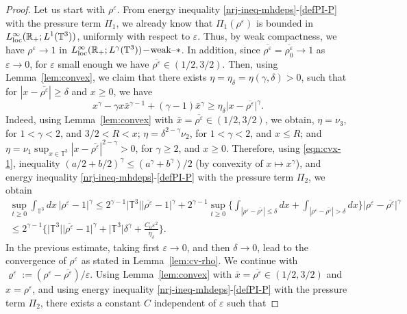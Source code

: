 \documentclass[11pt,reqno]{amsart}
\def \R{{\mathbb{R}}}
\def \T{{\mathbb{T}}}
\begin{document}
\begin{proof}
  Let us start with $\rho^\varepsilon$. From energy inequality \eqref{nrj-ineq-mhdeps}-\eqref{defPI-P} with the pressure term $\Pi_1$, we already know that $\Pi_1(\rho^\varepsilon)$ is  bounded in $ L_{\rm loc}^\infty(\R_+; L^1(\T^3))$, uniformly with respect to $\varepsilon$. Thus, by weak compactness, we have  $\rho^\varepsilon \rightarrow 1$ in $L_{\rm loc}^\infty(\R_+; L^\gamma(\T^3))\!-\!\mbox{\rm weak--}\ast$. In addition, since $\overline{\rho^\varepsilon}=\overline{\rho_0^\varepsilon}\rightarrow 1$ as $\varepsilon\rightarrow 0$, for $\varepsilon$ small enough we have $\overline{\rho^\varepsilon}\in (1/2,3/2)$. Then, using Lemma~\ref{lem:convex}, we claim that there exists $\eta=\eta_\delta=\eta(\gamma,\delta) >0$, such that for $|x-\overline{\rho^\varepsilon}|\geq \delta$ and $x\geq 0$, we have
  \begin{equation}
    \label{eqn:cvx-1}
    x^\gamma  - \gamma x\bar{x}^{\gamma -1} + (\gamma-1)\bar{x}^\gamma \geq \eta_\delta \big |x-\overline{\rho^\varepsilon}\big |^\gamma.   
  \end{equation}
  Indeed, using  Lemma~\ref{lem:convex} with  $\bar x = \overline{\rho^\varepsilon} \in  (1/2,3/2)$, we obtain, $\eta=\nu_3$, for $1<\gamma < 2$, and $3/2<R<x$;  $\eta=\delta^{2-\gamma}\nu_2$,  for $1< \gamma < 2$, and $x\leq R$; and  $\eta=\nu_1\sup_{x\in\T^3}|x-\overline{\rho^\varepsilon}|^{2-\gamma}>0$,  for $\gamma \geq 2$, and $x\geq 0$. Therefore, using \eqref{eqn:cvx-1}, inequality $(a/2 +b/2)^\gamma \leq (a^\gamma + b^\gamma)/2$ (by convexity of $x\mapsto x^\gamma$), and energy inequality \eqref{nrj-ineq-mhdeps}-\eqref{defPI-P} with the pressure term $\Pi_2$, we obtain
  \begin{multline*}
    \sup_{t\geq 0}\int_{\T^3} dx\, |\rho^\varepsilon-1|^\gamma \leq 2^{\gamma-1}\big|\T^3\big|\big |\overline{\rho^\varepsilon}-1\big|^\gamma+
    2^{\gamma-1} \sup_{t\geq 0}\bigg\{ \int_{|\rho^\varepsilon-\overline{\rho^\varepsilon}| \leq \delta} dx
    +\int_{|\rho^\varepsilon-\overline{\rho^\varepsilon}| > \delta} dx \bigg\}
    \big |\rho^\varepsilon-\overline{\rho^\varepsilon}\big|^\gamma
    \\ \leq  2^{\gamma-1}\bigg\{\big|\T^3\big| \big |\overline{\rho^\varepsilon}-1\big|^\gamma+ \big|\T^3\big|\delta^\gamma +  \frac{C_0 \varepsilon^2}{\eta_\delta} \bigg\}.
  \end{multline*}
  In the previous estimate, taking first $\varepsilon \rightarrow 0$, and then  $\delta\rightarrow 0$, lead to the convergence of $\rho^\varepsilon$ as stated in Lemma~\ref{lem:cv-rho}. We continue with   $\varrho^\varepsilon:=(\rho^\varepsilon -\overline{\rho^\varepsilon})/\varepsilon$. Using  Lemma~\ref{lem:convex} with  $\bar x = \overline{\rho^\varepsilon} \in  (1/2,3/2)$ and $x=\rho^\varepsilon$, and using  energy inequality \eqref{nrj-ineq-mhdeps}-\eqref{defPI-P} with the pressure term $\Pi_2$, there exists a constant $C$ independent of $\varepsilon$ such that

\end{proof}
\end{document}
